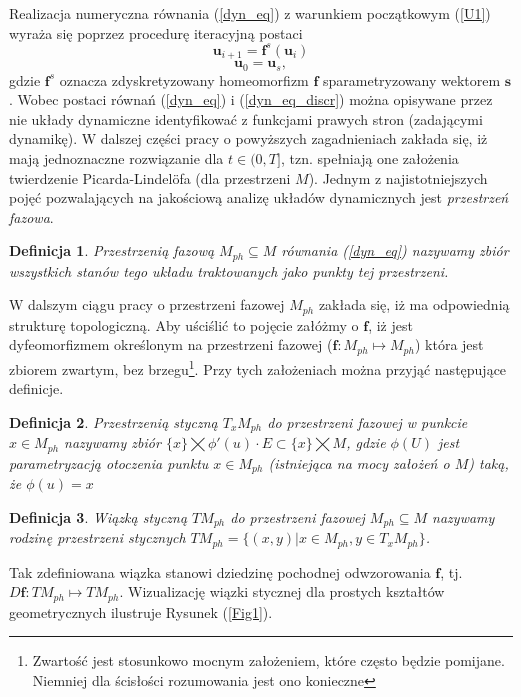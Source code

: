 \documentclass[12pt, twoside]{book}
\newtheorem{defi}{Definicja}
\begin{document}
Realizacja numeryczna równania (\ref{dyn_eq}) z warunkiem początkowym (\ref{U1}) wyraża się poprzez procedurę iteracyjną postaci
\begin{equation}
\textbf{u}_{i+1} = \textbf{f}^{s}(\textbf{u}_{i})
\label{dyn_eq_discr}
\end{equation}
\begin{equation}
\textbf{u}_{0} = \textbf{u}_{s},
\label{U2}
\end{equation}
gdzie $ \textbf{f}^{s} $ oznacza zdyskretyzowany homeomorfizm $ \textbf{f} $ sparametryzowany wektorem $ \textbf{s} $. Wobec postaci równań (\ref{dyn_eq}) i (\ref{dyn_eq_discr}) można opisywane przez nie układy dynamiczne identyfikować z funkcjami prawych stron (zadającymi dynamikę). W dalszej części pracy o powyższych zagadnieniach zakłada się, iż mają jednoznaczne rozwiązanie dla  $t\in(0,T]$, tzn. spełniają one założenia twierdzenie Picarda-Lindelöfa (dla przestrzeni $ M $). Jednym z najistotniejszych pojęć pozwalających na jakościową analizę układów dynamicznych jest \textit{przestrzeń fazowa}.
\begin{defi}\label{ph_space}
	Przestrzenią fazową $M_{ph} \subseteq M $ równania (\ref{dyn_eq}) nazywamy zbiór wszystkich stanów tego układu traktowanych jako punkty tej przestrzeni.
\end{defi}
W dalszym ciągu pracy o przestrzeni fazowej $ M_{ph} $ zakłada się, iż ma odpowiednią strukturę topologiczną. Aby uściślić to pojęcie załóżmy o $ \textbf{f} $, iż jest dyfeomorfizmem określonym na przestrzeni fazowej ($  \textbf{f}: M_{ph} \mapsto M_{ph}$) która jest zbiorem zwartym, bez brzegu\footnote{Zwartość jest stosunkowo mocnym założeniem, które często będzie pomijane. Niemniej dla ścisłości rozumowania jest ono konieczne}. Przy tych założeniach można przyjąć następujące definicje. 
\begin{defi}\label{tan_space}
	Przestrzenią styczną $ T_{x}M_{ph} $ do przestrzeni fazowej w punkcie $ x\in M_{ph} $ nazywamy zbiór $ \{x\} \bigtimes \phi'(u)\cdot E \subset \{x\}\bigtimes M$, gdzie $ \phi (U) $ jest parametryzacją otoczenia punktu $ x\in M_{ph} $ (istniejąca na mocy założeń o $ M $) taką, że $ \phi (u) = x $
\end{defi}
\begin{defi}\label{tan_bundle}
	Wiązką styczną $ TM_{ph} $ do przestrzeni fazowej $M_{ph} \subseteq M $ nazywamy rodzinę przestrzeni stycznych $  TM_{ph} = \{ (x,y) | x \in M_{ph} , y \in T_{x} M_{ph}\} $.
\end{defi}
Tak zdefiniowana wiązka stanowi dziedzinę pochodnej odwzorowania $ \textbf{f} $, tj. $ D\textbf{f}:TM_{ph} \mapsto TM_{ph}  $. Wizualizację wiązki stycznej dla prostych kształtów geometrycznych ilustruje Rysunek (\ref{Fig1}).
\end{document}

